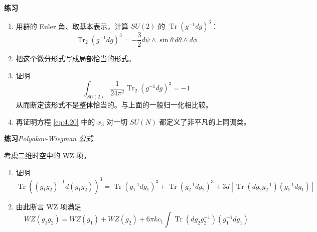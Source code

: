 \medskip\noindent\textbf{练习}
\begin{enumerate}[label=\textup{\alph*.)}]
  \item 用群的 Euler 角、取基本表示，计算 $SU(2)$ 的 $\operatorname{Tr}(g^{-1}dg)^3$：
  \begin{equation}
    \operatorname{Tr}_2(g^{-1}dg)^3=-\frac{3}{2}d\psi\wedge\sin\theta\,d\theta\wedge d\phi
    \tag{4.25}
    \label{eq:4.25}
  \end{equation}
  \item 把这个微分形式写成局部恰当的形式。
  \item 证明
  \begin{equation}
    \int_{SU(2)}\frac{1}{24\pi^2}\operatorname{Tr}_2(g^{-1}dg)^3=-1
    \tag{4.26}
    \label{eq:4.26}
  \end{equation}
  从而断定该形式不是整体恰当的。与上面的一般归一化相比较。
  \item 再证明方程 \eqref{eq:4.20} 中的 $x_3$ 对一切 $SU(N)$ 都定义了非平凡的上同调类。
\end{enumerate}


\medskip\noindent\textbf{练习}\quad\emph{Polyakov-Wiegman 公式}

考虑二维时空中的 WZ 项。

\begin{enumerate}[label=\textup{\alph*.)}]
  \item 证明
  \begin{equation}
    \operatorname{Tr}((g_1g_2)^{-1}d(g_1g_2))^3
    =\operatorname{Tr}(g_1^{-1}dg_1)^3+\operatorname{Tr}(g_2^{-1}dg_2)^3
    +3d\left[\operatorname{Tr}(dg_2g_2^{-1})(g_1^{-1}dg_1)\right]
    \tag{4.27}
    \label{eq:4.27}
  \end{equation}
  \item 由此断言 WZ 项满足
  \begin{equation}
    WZ(g_1g_2)=WZ(g_1)+WZ(g_2)+6\pi kc_1\int\operatorname{Tr}(dg_2g_2^{-1})(g_1^{-1}dg_1)
    \tag{4.28}
    \label{eq:4.28}
  \end{equation}
\end{enumerate}

